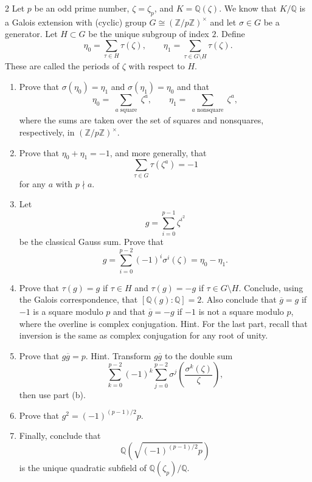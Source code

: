 \documentclass[12pt]{article}
\begin{document}
\begin{problem}{2}
    Let $p$ be an odd prime number, $\zeta = \zeta_p$, and $K = \mathbb{Q}(\zeta)$. We know that $K/\mathbb{Q}$ is a Galois extension with (cyclic) group $G \cong (\mathbb{Z}/p\mathbb{Z})^\times$ and let $\sigma \in G$ be a generator. Let $H \subset G$ be the unique subgroup of index $2$. Define
    \[
    \eta_0 = \sum_{\tau \in H} \tau(\zeta),
    \qquad
    \eta_1 = \sum_{\tau \in G \setminus H} \tau(\zeta).
    \]
    These are called the periods of $\zeta$ with respect to $H$.

    \begin{enumerate}
    \item[(a)] Prove that $\sigma(\eta_0) = \eta_1$ and $\sigma(\eta_1) = \eta_0$ and that
    \[
    \eta_0 = \sum_{\substack{a \text{ square}}} \zeta^a,
    \qquad
    \eta_1 = \sum_{\substack{a \text{ nonsquare}}} \zeta^a,
    \]
    where the sums are taken over the set of squares and nonsquares, respectively, in $(\mathbb{Z}/p\mathbb{Z})^\times$.

    \item[(b)] Prove that $\eta_0 + \eta_1 = -1$, and more generally, that
    \[
    \sum_{\tau \in G} \tau(\zeta^a) = -1
    \]
    for any $a$ with $p \nmid a$.

    \item[(c)] Let
    \[g = \sum_{i=0}^{p-1} \zeta^{i^2}\]
    be the classical Gauss sum. Prove that
    \[g = \sum_{i=0}^{p-2} (-1)^i \sigma^i(\zeta) = \eta_0 - \eta_1.\]

    \item[(d)] Prove that $\tau(g) = g$ if $\tau \in H$ and $\tau(g) = -g$ if $\tau \in G \setminus H$. Conclude, using the Galois correspondence, that $[\mathbb{Q}(g) : \mathbb{Q}] = 2$. Also conclude that $\overline{g} = g$ if $-1$ is a square modulo $p$ and that $\overline{g} = -g$ if $-1$ is not a square modulo $p$, where the overline is complex conjugation. Hint. For the last part, recall that inversion is the same as complex conjugation for any root of unity.

    \item[(e)] Prove that $g\overline{g} = p$. Hint. Transform $g\overline{g}$ to the double sum
    \[
    \sum_{k=0}^{p-2} (-1)^k
    \sum_{j=0}^{p-2} \sigma^j\!\left(\frac{\sigma^k(\zeta)}{\zeta}\right),
    \]
    then use part (b).

    \item[(f)] Prove that $g^2 = (-1)^{(p-1)/2} p$.

    \item[(g)] Finally, conclude that
    \[
    \mathbb{Q}\!\left(\sqrt{(-1)^{(p-1)/2} p}\right)
    \]
    is the unique quadratic subfield of $\mathbb{Q}(\zeta_p)/\mathbb{Q}$.
    \end{enumerate}
\end{problem}
\end{document}
